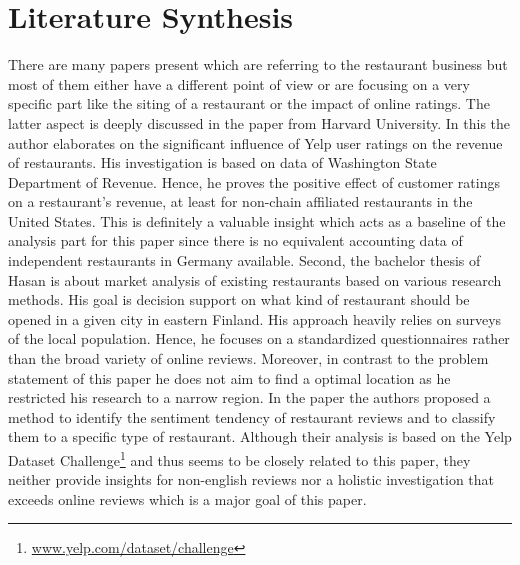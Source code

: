 \section{Literature Synthesis}
\label{sec:synthesis}
There are many papers present which are referring to the restaurant business but most of them either have a different point of view or are focusing on a very specific part like the siting of a restaurant or the impact of online ratings.
\newline
The latter aspect is deeply discussed in the paper from Harvard University\cite{CaseOfYelp}. In this the author elaborates on the significant influence of Yelp user ratings on the revenue of restaurants. His investigation is based on data of Washington State Department of Revenue. Hence, he proves the positive effect of customer ratings on a restaurant's revenue, at least for non-chain affiliated restaurants in the United States. This is definitely a valuable insight which acts as a baseline of the analysis part for this paper since there is no equivalent accounting data of independent restaurants in Germany available.
\newline
Second, the bachelor thesis of Hasan\cite{Imatra} is about market analysis of existing restaurants based on various research methods. His goal is decision support on what kind of restaurant should be opened in a given city in eastern Finland. His approach heavily relies on surveys of the local population. Hence, he focuses on a standardized questionnaires rather than the broad variety of online reviews. Moreover, in contrast to the problem statement of this paper he does not aim to find a optimal location as he restricted his research to a narrow region.
\newline
In the paper \cite{SentimentAnalysis} the authors proposed a method to identify the sentiment tendency of restaurant reviews and to classify them to a specific type of restaurant. Although their analysis is based on the Yelp Dataset Challenge\footnote{\href{https://www.yelp.com/dataset/challenge}{www.yelp.com/dataset/challenge}} and thus seems to be closely related to this paper, they neither provide insights for non-english reviews nor a holistic investigation that exceeds online reviews which is a major goal of this paper.
